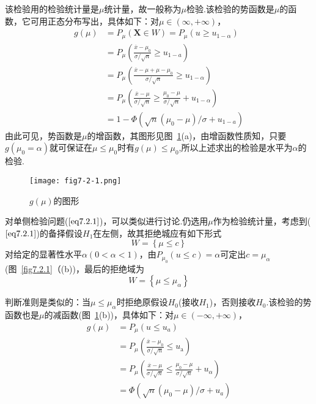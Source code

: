 该检验用的检验统计量是$\mu $统计量，故一般称为$\mu $检验.该检验的势函数是$\mu $的函数，它可用正态分布写出，具体如下：对$\mu \in(\infty,+\infty)$，
\begin{align*}
g ( \mu ) &= P _ { \mu } ( \mathbf { X } \in W ) = P _ { \mu } \left( u \geq u _ { 1 - \alpha } \right)\\
&= P _ { \mu } \left( \frac { \overline { x } - \mu _ { 0 } } { \sigma / \sqrt { n } } \geq u _ { 1 - a } \right)\\
&= P _ { \mu } \left( \frac { \overline { x } - \mu + \mu - \mu _ { 0 } } { \sigma / \sqrt { n } } \geq u _ { 1 - \alpha } \right)\\
&= P _ { \mu } \left( \frac { \overline { x } - \mu } { \sigma / \sqrt { n } } \geq \frac { \mu _ { 0 } - \mu } { \sigma / \sqrt { n } } + u _ { 1 - \alpha } \right)\\
&= 1 - \Phi \left( \sqrt { n } \left( \mu _ { 0 } - \mu \right) / \sigma + u _ { 1 - a } \right)
\end{align*}
由此可见，势函数是$\mu $的增函数，其图形见图~\ref{fig7.2.2}(a)，由增函数性质知，只要$g(\mu_{0}=\alpha)$就可保证在$\mu \leq \mu_{ 0 }$时有$g(\mu )\leq \mu_{ 0 }$,所以上述求出的检验是水平为$\alpha$的检验.
\begin{figure}[htbp]
	\centering
	\texttt{[image: fig7-2-1.png]}
	\caption{$g(\mu ) $的图形}\label{fig7.2.2}
\end{figure}

对单侧检验问题($\ref{eq7.2.1}$)，可以类似进行讨论.仍选用$\mu $作为检验统计量，考虑到($\ref{eq7.2.1}$)的备择假设$H_{1}$在左侧，故其拒绝城应有如下形式
\[
W=\left\{\mu\le c\right\}
\]
对给定的显著性水平$\alpha(0<\alpha<1)$，由$P _ { \mu _ { 0 } } ( u \leq c ) = \alpha$可定出$c=\mu_{\alpha}$(图~\ref{fig7.2.1}（(b))，最后的拒绝域为
\begin{equation}\label{eq7.2.7}
W=\left\{\mu\le\mu_{\alpha}\right\}
\end{equation}

判断准则是类似的：当$\mu\le\mu_{\alpha}$时拒绝原假设$H_{0}$(接收$H_{1}$)，否则接收$H_{0}$.该检验的势函数也是$\mu $的减函数(图~\ref{fig7.2.2}(b))，具体如下：对$\mu \in(-\infty,+\infty)$，
\begin{align*}
g ( \mu ) &= P _ { \mu } \left( u \leq u _ { a } \right)\\
&= P _ { \mu } \left( \frac { \overline { x } - \mu _ { 0 } } { \sigma / \sqrt { n } } \leq u _ { \mathrm { a } } \right)\\
&= P _ { \mu } \left( \frac { \overline { x } - \mu } { \sigma / \sqrt { n } } \leq \frac { \mu _ { 0 } - \mu } { \sigma / \sqrt { n } } + u _ { \alpha } \right)\\
&= \Phi \left( \sqrt { n } \left( \mu _ { 0 } - \mu \right) / \sigma + u _ { a } \right)
\end{align*}

